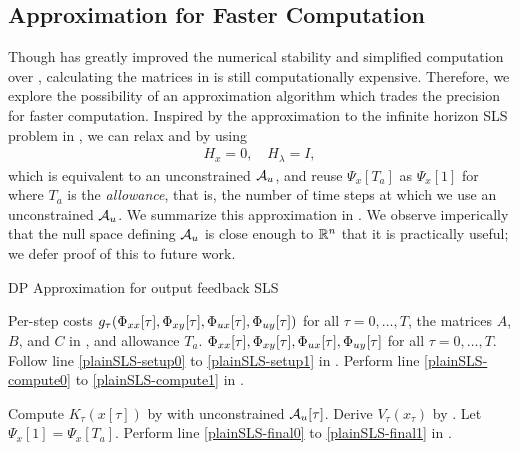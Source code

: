 \subsection{Approximation for Faster Computation}
Though  has greatly improved the numerical stability and simplified computation over , calculating the matrices in  is still computationally expensive. Therefore, we explore the possibility of an approximation algorithm which trades the precision for faster computation. Inspired by the approximation to the infinite horizon SLS problem
in \cite{tseng2020system}, we can relax  and  by using
\begin{align*}
H_x = 0, \quad H_\lambda = I,
\end{align*}
which is equivalent to an unconstrained $\mathcal{A}_u$, and reuse $\Psi_x[T_a]$ as $\Psi_x[1]$ for 
 where $T_a$ is the \emph{allowance}, that is, the number of time steps at which we use
an unconstrained $\mathcal{A}_u$. We summarize this approximation in . We observe imperically that the null space defining $\mathcal{A}_u$ is close enough to $\mathbb{R}^n$ that it is practically useful; we defer proof of this to future work.

\iffalse
The nullspace operation in Corollary 1 is computationally expensive, so we develop an approximation algorithm that
reduces the number of times the nullspace is used. Inspired by the approximation to the infinite horizon SLS problem
in \cite{tseng2020system}, we approximate $\nullspace \Psi_x[t]$ by "reusing" the set $\bar{\mathcal{A}_u}$
for times $t<T$. The set $\bar{\mathcal{A}_u}$ is computed using Corollary 1, with $\Psi_x=S_x-I$. Thus
the only constraint we place on the set of admissible inputs is that $\uy[t]$ will ensure that $\xx[t+1]=\xx[t]A+\xy[t]C$. 
This in turn relaxes the constraint that $\xy[T+1]=\xx[T+1]=\ux[T+1]=0$; our results show that this condition is still met 
even without the formal guarantee. The steps are summarized in algorithm \ref{alg:approxDP}.
\fi 

\begin{algorithm}
\caption{DP Approximation for output feedback SLS}\label{alg:approxDP}
\begin{algorithmic}[1]
    \REQUIRE Per-step costs $g_{\tau}(\Phi_{xx}[\tau],\Phi_{xy}[\tau],\Phi_{ux}[\tau],\Phi_{uy}[\tau])$ for all $\tau = 0, \dots, T$, the matrices $A$, $B$, and $C$ in , and allowance $T_a$.
    \ENSURE $\Phi_{xx}[\tau],\Phi_{xy}[\tau],\Phi_{ux}[\tau],\Phi_{uy}[\tau]$ for all $\tau = 0, \dots, T$.
    \STATE Follow line \ref{plainSLS-setup0} to \ref{plainSLS-setup1} in .
        \STATE Perform line \ref{plainSLS-compute0} to \ref{plainSLS-compute1} in .
    \ENDFOR
	
        \STATE Compute $K_{\tau}(x[\tau])$ by  with unconstrained $\mathcal{A}_u[\tau]$.
        \STATE Derive $V_{\tau}(x_{\tau})$ by .
    \ENDFOR
    \STATE Let $\Psi_x[1] = \Psi_x[T_a]$.
    \STATE Perform line \ref{plainSLS-final0} to \ref{plainSLS-final1} in .
\end{algorithmic}
\end{algorithm}